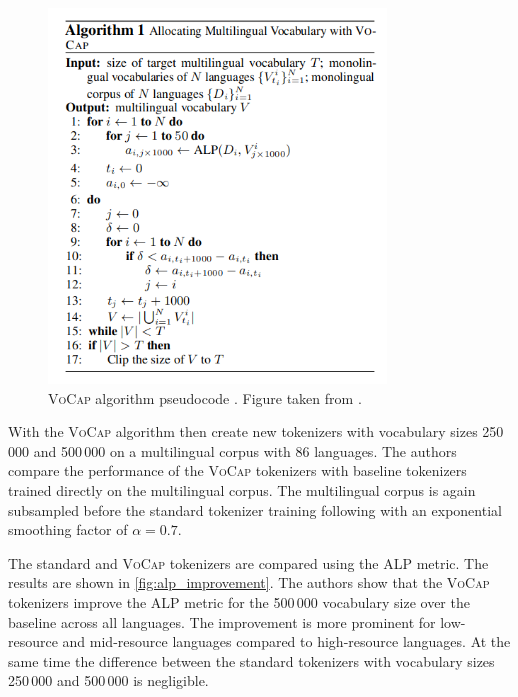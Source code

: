 \begin{figure}[ht]
    \centering
    \includegraphics[width=0.8\textwidth]{img/temp/vocap_algo.png}
    \caption{\textsc{VoCap} algorithm pseudocode \cite{zheng_allocating_2021}. Figure taken from \cite{zheng_allocating_2021}.}
    \label{alg:vocab_allocation}
\end{figure}

With the \textsc{VoCap} algorithm  then create new tokenizers with vocabulary sizes 250\,000 and 500\,000 on a multilingual corpus with 86 languages. The authors compare the performance of the \textsc{VoCap} tokenizers with baseline tokenizers trained directly on the multilingual corpus. The multilingual corpus is again subsampled before the standard tokenizer training following \citet{devlin_bert_2019,lample_cross-lingual_2019} with an exponential smoothing factor of $\alpha=0.7$.

The standard and \textsc{VoCap} tokenizers are compared using the ALP metric. The results are shown in \autoref{fig:alp_improvement}. The authors show that the \textsc{VoCap} tokenizers improve the ALP metric for the 500\,000 vocabulary size over the baseline across all languages. The improvement is more prominent for low-resource and mid-resource languages compared to high-resource languages. At the same time the difference between the standard tokenizers with vocabulary sizes 250\,000 and 500\,000 is negligible.

